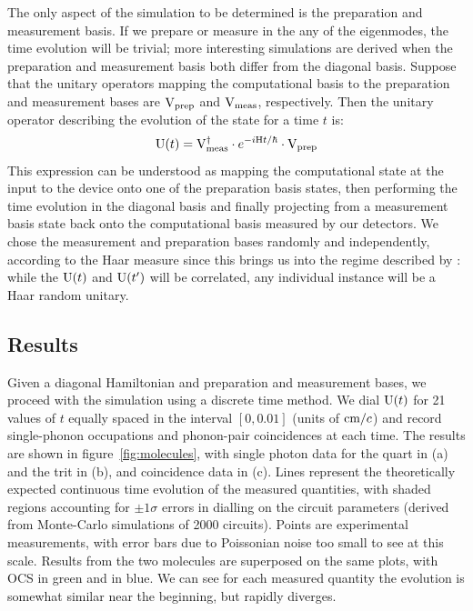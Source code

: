 The only aspect of the simulation to be determined is the preparation and
measurement basis. If we prepare or measure in the any of the eigenmodes, the
time evolution will be trivial; more interesting simulations are derived when
the preparation and measurement basis both differ from the diagonal basis.
Suppose that the unitary
operators mapping the computational basis to the preparation and measurement
bases are \(\mathrm{V}_{\text{prep}}\) and \(\mathrm{V}_{\text{meas}}\), respectively. Then the
unitary operator describing the evolution of
the state for a time \(t\) is:
\begin{equation}
  \mathrm{U} \!\left(t\right) = \mathrm{V}_{\text{meas}}^{\dagger} \cdot e^{-i \mathrm{H} t/\hbar} \cdot
  \mathrm{V}_{\text{prep}}
\end{equation}
This expression can be understood as mapping the computational state at the
input to the device onto one of the preparation basis states, then performing
the time evolution in the diagonal basis and finally projecting from a
measurement basis state back onto the computational basis measured by our
detectors. We chose the measurement and preparation bases randomly and
independently, according to the Haar measure since this brings us into the
regime described by \bosonsampling{}: while the \(\mathrm{U} \!\left(t\right)\) and \(\mathrm{U}
\!\left(t^{\prime}\right) \) will be correlated, any individual instance will be a Haar
random unitary.

\subsection{Results}
Given a diagonal Hamiltonian and preparation and measurement bases, we proceed
with the simulation using a discrete time method. We dial \(\mathrm{U} \!\left(t\right)\) for
21 values of \(t\) equally spaced in the interval \(\left[0,0.01\right]\)
(units of \(\text{cm} / c\)) and record single-phonon occupations and
phonon-pair coincidences at each time. The results are shown in
figure~\ref{fig:molecules}, with single photon data for the quart in (a) and the
trit in (b), and coincidence data in (c). Lines represent the theoretically
expected continuous time evolution of the measured quantities, with shaded
regions accounting for \(\pm 1 \sigma\) errors in dialling on the circuit
parameters (derived from Monte-Carlo simulations of 2000 circuits). Points are
experimental measurements, with error bars due to Poissonian noise too small to
see at this scale. Results from the two molecules are superposed on the same
plots, with OCS in green and \co in blue. We can see for each measured quantity
the evolution is somewhat similar near the beginning, but rapidly diverges.

